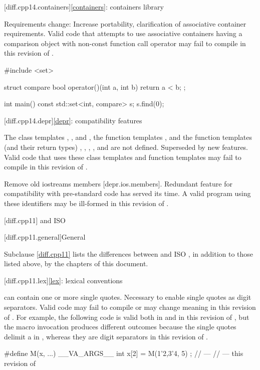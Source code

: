 [diff.cpp14.containers]{\ref*{containers}: containers library}

\change
Requirements change:
\rationale
Increase portability, clarification of associative container requirements.
\effect
Valid \CppXIV{} code that attempts to use associative containers
having a comparison object with non-const function call operator
may fail to compile in this revision of \Cpp{}.
\begin{example}
\begin{codeblock}
#include <set>

struct compare
{
  bool operator()(int a, int b)
  {
    return a < b;
  }
};

int main() {
  const std::set<int, compare> s;
  s.find(0);
}
\end{codeblock}
\end{example}

[diff.cpp14.depr]{\ref*{depr}: compatibility features}

\nodiffref
\change
The class templates
,
, and
,
the function templates
,
and the function templates (and their return types)
,
,
,
, and
are not defined.
\rationale
Superseded by new features.
\effect
Valid \CppXIV{} code that uses these class templates
and function templates may fail to compile in this revision of \Cpp{}.

\nodiffref
\change
Remove old iostreams members [depr.ios.members].
\rationale
Redundant feature for compatibility with pre-standard code
has served its time.
\effect
A valid \CppXIV{} program using these identifiers
may be ill-formed in this revision of \Cpp{}.

[diff.cpp11]{\Cpp{} and ISO \CppXI{}}

[diff.cpp11.general]{General}

\pnum
{}%
Subclause \ref{diff.cpp11} lists the differences between \Cpp{} and
ISO \CppXI{},
in addition to those listed above,
by the chapters of this document.

[diff.cpp11.lex]{\ref*{lex}: lexical conventions}

\change
{} can contain one or more single quotes.
\rationale
Necessary to enable single quotes as digit separators.
\effect
Valid \CppXI{} code may fail to compile or may change meaning in this
revision of \Cpp{}. For example, the following code is valid both in \CppXI{} and in
this revision of \Cpp{}, but the macro invocation produces different outcomes
because the single quotes delimit a  in \CppXI{}, whereas they are digit
separators in this revision of \Cpp{}.
\begin{example}
\begin{codeblock}
#define M(x, ...) __VA_ARGS__
int x[2] = { M(1'2,3'4, 5) };
//  --- \CppXI{}
//  --- this revision of \Cpp{}
\end{codeblock}
\end{example}

